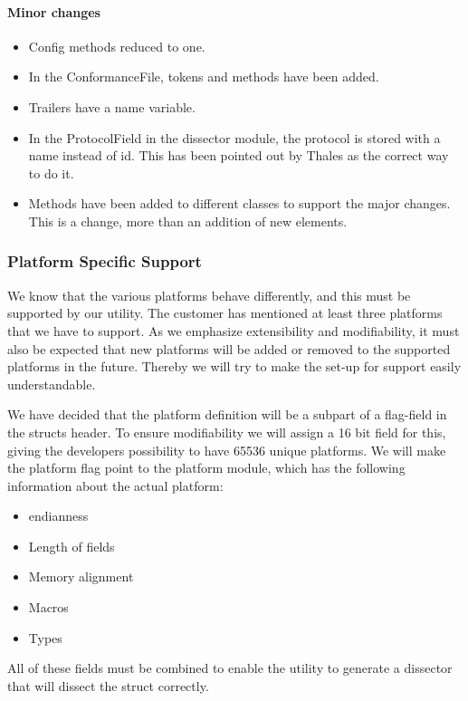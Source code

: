 \paragraph{Minor changes}
\begin{itemize}
\item Config methods reduced to one.
\item In the ConformanceFile, tokens and methods have been added.
\item Trailers have a name variable.
\item In the ProtocolField in the \gls{dissector} module, the \gls{protocol} is stored with a name instead of id. This has been pointed out by Thales as the correct way to do it.
\item Methods have been added to different classes to support the major changes. This is a change, more than an addition of new elements. 
\end{itemize}

\subsubsection{Platform Specific Support}
We know that the various platforms behave differently, and this must be supported by our \gls{utility}. The customer has mentioned at least three platforms that we have to support. As we emphasize extensibility and modifiability, it must also be expected that new platforms will be added or removed to the supported platforms in the future. Thereby we will try to make the set-up for support easily understandable.

We have decided that the platform definition will be a subpart of a flag-field in the \glspl{struct} \gls{header}. To ensure modifiability we will assign a 16 bit field for this, giving the developers possibility to have 65536 unique platforms. We will make the platform flag point to the platform module, which has the following information about the actual platform:
\begin{itemize}
\item \Gls{endianness}
\item Length of fields
\item Memory alignment
\item Macros
\item Types
\end{itemize}
All of these fields must be combined to enable the \gls{utility} to generate a \gls{dissector} that will dissect the \gls{struct} correctly.

